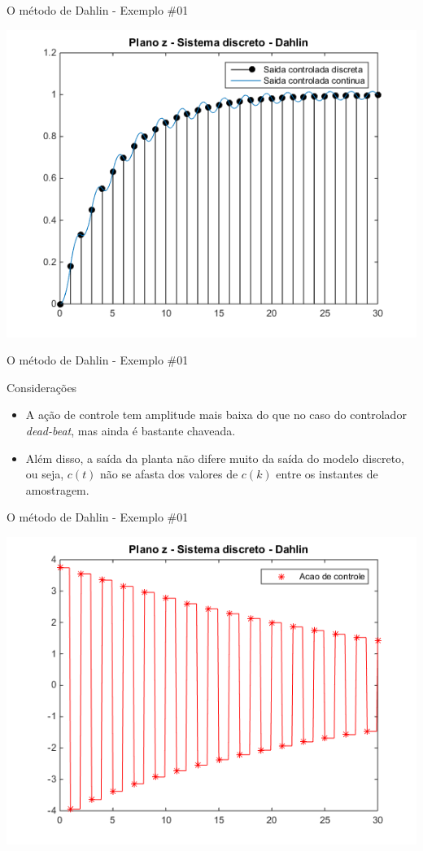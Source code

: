 \begin{frame}{O método de Dahlin - Exemplo \#01}
\centerline{\includegraphics[width=0.8\linewidth]{Figuras/Ch12/fig7.png}}
\end{frame}

\begin{frame}{O método de Dahlin - Exemplo \#01}
\begin{block}{Considerações}
\begin{itemize}
    \item A ação de controle tem amplitude mais baixa do que no caso do controlador \textit{dead-beat}, mas ainda é bastante chaveada.
    \item Além disso, a saída da planta não difere muito da saída do modelo discreto,  ou seja, $c(t)$ não se afasta dos valores de $c(k)$ entre os instantes de amostragem.
\end{itemize}
\end{block}
\end{frame}

\begin{frame}{O método de Dahlin - Exemplo \#01}
\centerline{\includegraphics[width=0.8\linewidth]{Figuras/Ch12/fig8.png}}
\end{frame}

